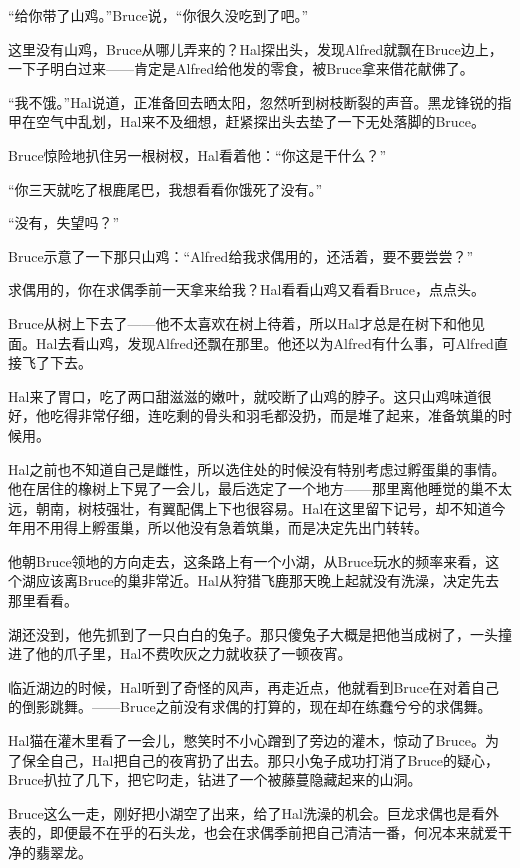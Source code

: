 \documentclass[../main.tex]{subfiles}
\begin{document}
``给你带了山鸡。''Bruce说，``你很久没吃到了吧。''

这里没有山鸡，Bruce从哪儿弄来的？Hal探出头，发现Alfred就飘在Bruce边上，一下子明白过来------肯定是Alfred给他发的零食，被Bruce拿来借花献佛了。

``我不饿。''Hal说道，正准备回去晒太阳，忽然听到树枝断裂的声音。黑龙锋锐的指甲在空气中乱划，Hal来不及细想，赶紧探出头去垫了一下无处落脚的Bruce。

Bruce惊险地扒住另一根树杈，Hal看着他：``你这是干什么？''

``你三天就吃了根鹿尾巴，我想看看你饿死了没有。''

``没有，失望吗？''

Bruce示意了一下那只山鸡：``Alfred给我求偶用的，还活着，要不要尝尝？''

求偶用的，你在求偶季前一天拿来给我？Hal看看山鸡又看看Bruce，点点头。

Bruce从树上下去了------他不太喜欢在树上待着，所以Hal才总是在树下和他见面。Hal去看山鸡，发现Alfred还飘在那里。他还以为Alfred有什么事，可Alfred直接飞了下去。

Hal来了胃口，吃了两口甜滋滋的嫩叶，就咬断了山鸡的脖子。这只山鸡味道很好，他吃得非常仔细，连吃剩的骨头和羽毛都没扔，而是堆了起来，准备筑巢的时候用。

Hal之前也不知道自己是雌性，所以选住处的时候没有特别考虑过孵蛋巢的事情。他在居住的橡树上下晃了一会儿，最后选定了一个地方------那里离他睡觉的巢不太远，朝南，树枝强壮，有翼配偶上下也很容易。Hal在这里留下记号，却不知道今年用不用得上孵蛋巢，所以他没有急着筑巢，而是决定先出门转转。

他朝Bruce领地的方向走去，这条路上有一个小湖，从Bruce玩水的频率来看，这个湖应该离Bruce的巢非常近。Hal从狩猎飞鹿那天晚上起就没有洗澡，决定先去那里看看。

湖还没到，他先抓到了一只白白的兔子。那只傻兔子大概是把他当成树了，一头撞进了他的爪子里，Hal不费吹灰之力就收获了一顿夜宵。

临近湖边的时候，Hal听到了奇怪的风声，再走近点，他就看到Bruce在对着自己的倒影跳舞。------Bruce之前没有求偶的打算的，现在却在练蠢兮兮的求偶舞。

Hal猫在灌木里看了一会儿，憋笑时不小心蹭到了旁边的灌木，惊动了Bruce。为了保全自己，Hal把自己的夜宵扔了出去。那只小兔子成功打消了Bruce的疑心，Bruce扒拉了几下，把它叼走，钻进了一个被藤蔓隐藏起来的山洞。

Bruce这么一走，刚好把小湖空了出来，给了Hal洗澡的机会。巨龙求偶也是看外表的，即便最不在乎的石头龙，也会在求偶季前把自己清洁一番，何况本来就爱干净的翡翠龙。
\end{document}
